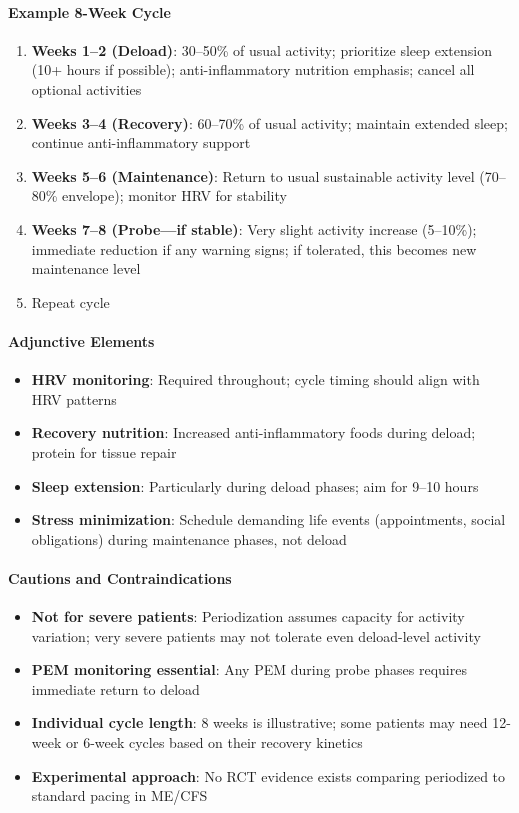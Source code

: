 \begin{protocol}
\paragraph{Example 8-Week Cycle}
\begin{enumerate}
    \item \textbf{Weeks 1--2 (Deload)}: 30--50\% of usual activity; prioritize sleep extension (10+ hours if possible); anti-inflammatory nutrition emphasis; cancel all optional activities
    \item \textbf{Weeks 3--4 (Recovery)}: 60--70\% of usual activity; maintain extended sleep; continue anti-inflammatory support
    \item \textbf{Weeks 5--6 (Maintenance)}: Return to usual sustainable activity level (70--80\% envelope); monitor HRV for stability
    \item \textbf{Weeks 7--8 (Probe---if stable)}: Very slight activity increase (5--10\%); immediate reduction if any warning signs; if tolerated, this becomes new maintenance level
    \item Repeat cycle
\end{enumerate}

\paragraph{Adjunctive Elements}
\begin{itemize}
    \item \textbf{HRV monitoring}: Required throughout; cycle timing should align with HRV patterns
    \item \textbf{Recovery nutrition}: Increased anti-inflammatory foods during deload; protein for tissue repair
    \item \textbf{Sleep extension}: Particularly during deload phases; aim for 9--10 hours
    \item \textbf{Stress minimization}: Schedule demanding life events (appointments, social obligations) during maintenance phases, not deload
\end{itemize}

\paragraph{Cautions and Contraindications}
\begin{itemize}
    \item \textbf{Not for severe patients}: Periodization assumes capacity for activity variation; very severe patients may not tolerate even deload-level activity
    \item \textbf{PEM monitoring essential}: Any PEM during probe phases requires immediate return to deload
    \item \textbf{Individual cycle length}: 8 weeks is illustrative; some patients may need 12-week or 6-week cycles based on their recovery kinetics
    \item \textbf{Experimental approach}: No RCT evidence exists comparing periodized to standard pacing in ME/CFS
\end{itemize}


\end{protocol}
